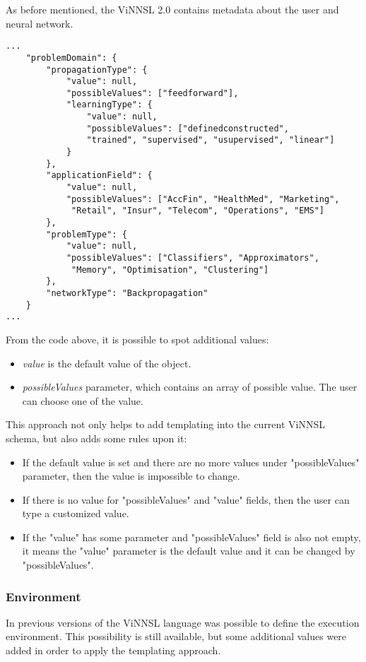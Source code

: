 As before mentioned, the ViNNSL 2.0 contains metadata about the user and neural network.

\begin{lstlisting}[caption=ViNNSL template metadata]
...
	"problemDomain": {
		"propagationType": {
			"value": null,
			"possibleValues": ["feedforward"],
			"learningType": {
				"value": null,
				"possibleValues": ["definedconstructed", 
				"trained", "supervised", "usupervised", "linear"]
			}
		},
		"applicationField": {
			"value": null,
			"possibleValues": ["AccFin", "HealthMed", "Marketing",
			 "Retail", "Insur", "Telecom", "Operations", "EMS"]
		},
		"problemType": {
			"value": null,
			"possibleValues": ["Classifiers", "Approximators",
			 "Memory", "Optimisation", "Clustering"]
		},
		"networkType": "Backpropagation"
	}
...
\end{lstlisting}

From the code above, it is possible to spot additional values:
\begin{itemize}
\item \emph{value} is the default value of the object. 
\item \emph{possibleValues} parameter, which contains an array of possible value. The user can choose one of the value. 
\end{itemize}

This approach not only helps to add templating into the current ViNNSL schema, but also adds some rules upon it:
\begin{itemize}
\item If the default value is set and there are no more values under "possibleValues" parameter, then the value is impossible to change.
\item If there is no value for "possibleValues" and "value" fields, then the user can type a customized value.
\item If the "value" has some parameter and "possibleValues" field is also not empty, it means the "value" parameter is the default value and it can be changed by "possibleValues".
\end{itemize}

\subsubsection{Environment}\label{Environment}

In previous versions of the ViNNSL language was possible to define the execution environment. This possibility is still available, but some additional values were added in order to apply the templating approach. 

